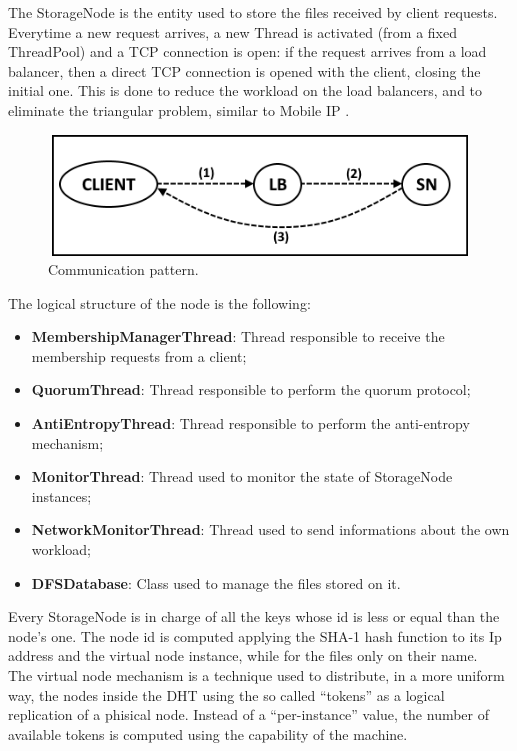 \documentclass[12pt, a4paper, oneside] {book}
\begin{document}
The StorageNode is the entity used to store the files received by client requests.
Everytime a new request arrives, a new Thread is activated (from a fixed ThreadPool) and a TCP connection is open: if the request arrives from a load balancer, then a direct TCP connection
is opened with the client, closing the initial one. This is done to reduce the workload on the load balancers, and to eliminate the triangular problem, similar to Mobile IP \cite{rif1}.\\

\begin{figure}[!htpb]
\centering
\includegraphics[width = 115mm, height = 32mm]{img/communication.png}
\caption{Communication pattern.}
\label{fig:abstract_orchestration}
\end{figure}

The logical structure of the node is the following:

\begin{itemize}
  \item \textbf{MembershipManagerThread}: Thread responsible to receive the membership requests from a client;
  \item \textbf{QuorumThread}: Thread responsible to perform the quorum protocol;
  \item \textbf{AntiEntropyThread}: Thread responsible to perform the anti-entropy mechanism;
  \item \textbf{MonitorThread}: Thread used to monitor the state of StorageNode instances;
  \item \textbf{NetworkMonitorThread}: Thread used to send informations about the own workload;
  \item \textbf{DFSDatabase}: Class used to manage the files stored on it.
\end{itemize}
Every StorageNode is in charge of all the keys whose id is less or equal than the node's one.
The node id is computed applying the SHA-1 hash function to its Ip address and the virtual node instance, while for the files only on their name.\\
The virtual node mechanism is a technique used to distribute, in a more uniform way, the nodes inside the DHT using the so called ``tokens'' as a logical replication of
a phisical node. Instead of a ``per-instance'' value, the number of available tokens is computed using the capability of the machine.
\end{document}
